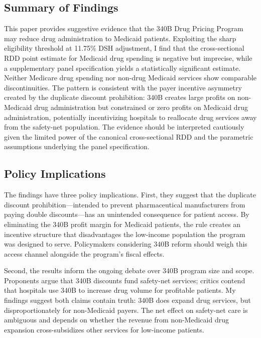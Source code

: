 \documentclass[12pt]{article}
\begin{document}
\subsection{Summary of Findings}

This paper provides suggestive evidence that the 340B Drug Pricing Program may reduce drug administration to Medicaid patients. Exploiting the sharp eligibility threshold at 11.75\% DSH adjustment, I find that the cross-sectional RDD point estimate for Medicaid drug spending is negative but imprecise, while a supplementary panel specification yields a statistically significant estimate. Neither Medicare drug spending nor non-drug Medicaid services show comparable discontinuities. The pattern is consistent with the payer incentive asymmetry created by the duplicate discount prohibition: 340B creates large profits on non-Medicaid drug administration but constrained or zero profits on Medicaid drug administration, potentially incentivizing hospitals to reallocate drug services away from the safety-net population. The evidence should be interpreted cautiously given the limited power of the canonical cross-sectional RDD and the parametric assumptions underlying the panel specification.

\subsection{Policy Implications}

The findings have three policy implications. First, they suggest that the duplicate discount prohibition---intended to prevent pharmaceutical manufacturers from paying double discounts---has an unintended consequence for patient access. By eliminating the 340B profit margin for Medicaid patients, the rule creates an incentive structure that disadvantages the low-income population the program was designed to serve. Policymakers considering 340B reform should weigh this access channel alongside the program's fiscal effects.

Second, the results inform the ongoing debate over 340B program size and scope. Proponents argue that 340B discounts fund safety-net services; critics contend that hospitals use 340B to increase drug volume for profitable patients. My findings suggest both claims contain truth: 340B does expand drug services, but disproportionately for non-Medicaid payers. The net effect on safety-net care is ambiguous and depends on whether the revenue from non-Medicaid drug expansion cross-subsidizes other services for low-income patients.
\end{document}
